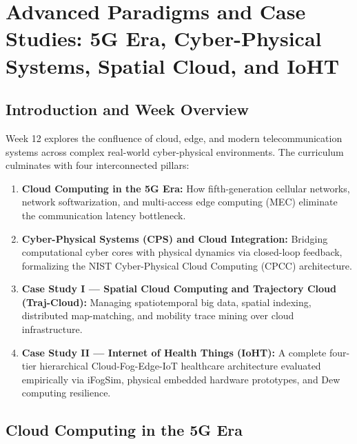 \documentclass[11pt,a4paper,openany]{report}
\begin{document}
\chapter{Advanced Paradigms and Case Studies: 5G Era, Cyber-Physical Systems, Spatial Cloud, and IoHT}

\section{Introduction and Week Overview}
Week 12 explores the confluence of cloud, edge, and modern telecommunication systems across complex real-world cyber-physical environments. The curriculum culminates with four interconnected pillars:
\begin{enumerate}[leftmargin=*]
  \item \textbf{Cloud Computing in the 5G Era:} How fifth-generation cellular networks, network softwarization, and multi-access edge computing (MEC) eliminate the communication latency bottleneck.
  \item \textbf{Cyber-Physical Systems (CPS) and Cloud Integration:} Bridging computational cyber cores with physical dynamics via closed-loop feedback, formalizing the NIST Cyber-Physical Cloud Computing (CPCC) architecture.
  \item \textbf{Case Study I --- Spatial Cloud Computing and Trajectory Cloud (Traj-Cloud):} Managing spatiotemporal big data, spatial indexing, distributed map-matching, and mobility trace mining over cloud infrastructure.
  \item \textbf{Case Study II --- Internet of Health Things (IoHT):} A complete four-tier hierarchical Cloud-Fog-Edge-IoT healthcare architecture evaluated empirically via iFogSim, physical embedded hardware prototypes, and Dew computing resilience.
\end{enumerate}

\section{Cloud Computing in the 5G Era}
\end{document}

